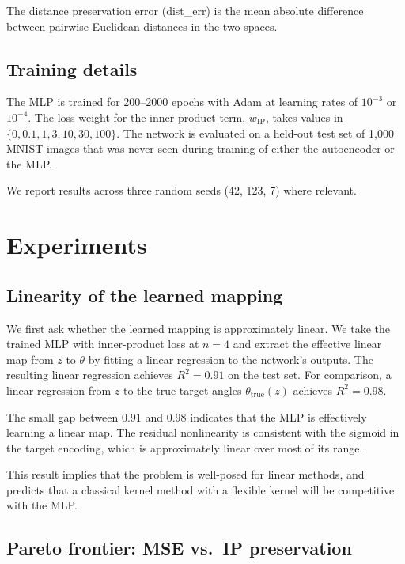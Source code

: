 \documentclass[11pt]{article}
\begin{document}
The distance preservation error (dist\_err) is the mean absolute difference
between pairwise Euclidean distances in the two spaces.

\subsection{Training details}

The MLP is trained for 200--2000 epochs with Adam at learning rates of
$10^{-3}$ or $10^{-4}$. The loss weight for the inner-product term,
$w_{\text{IP}}$, takes values in $\{0, 0.1, 1, 3, 10, 30, 100\}$. The
network is evaluated on a held-out test set of 1{,}000 MNIST images that
was never seen during training of either the autoencoder or the MLP.

We report results across three random seeds (42, 123, 7) where relevant.

\section{Experiments}
\label{sec:experiments}

\subsection{Linearity of the learned mapping}

We first ask whether the learned mapping is approximately linear. We take
the trained MLP with inner-product loss at $n=4$ and extract the effective
linear map from $z$ to $\theta$ by fitting a linear regression to the
network's outputs. The resulting linear regression achieves $R^{2} = 0.91$
on the test set. For comparison, a linear regression from $z$ to the true
target angles $\theta_{\text{true}}(z)$ achieves $R^{2} = 0.98$.

The small gap between $0.91$ and $0.98$ indicates that the MLP is
effectively learning a linear map. The residual nonlinearity is consistent
with the sigmoid in the target encoding, which is approximately linear over
most of its range.

This result implies that the problem is well-posed for linear methods, and
predicts that a classical kernel method with a flexible kernel will be
competitive with the MLP.

\subsection{Pareto frontier: MSE vs.\ IP preservation}
\end{document}
